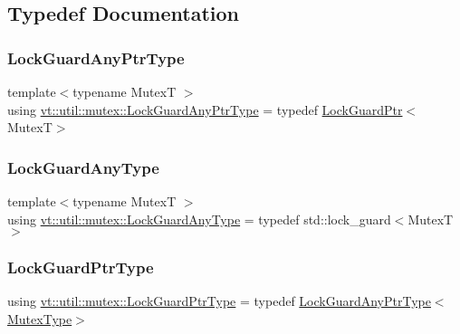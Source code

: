 \subsection{Typedef Documentation}
\mbox{\label{namespacevt_1_1util_1_1mutex_ab8d2986992b726eed741bcae3bf9a789}} 
\subsubsection{\texorpdfstring{Lock\+Guard\+Any\+Ptr\+Type}{LockGuardAnyPtrType}}
{\footnotesize\ttfamily template$<$typename MutexT $>$ \\
using \hyperlink{namespacevt_1_1util_1_1mutex_ab8d2986992b726eed741bcae3bf9a789}{vt\+::util\+::mutex\+::\+Lock\+Guard\+Any\+Ptr\+Type} = typedef \hyperlink{structvt_1_1util_1_1mutex_1_1_lock_guard_ptr}{Lock\+Guard\+Ptr}$<$MutexT$>$}

\mbox{\label{namespacevt_1_1util_1_1mutex_ae88ee37c8846b0738a5137f96f912394}} 
\subsubsection{\texorpdfstring{Lock\+Guard\+Any\+Type}{LockGuardAnyType}}
{\footnotesize\ttfamily template$<$typename MutexT $>$ \\
using \hyperlink{namespacevt_1_1util_1_1mutex_ae88ee37c8846b0738a5137f96f912394}{vt\+::util\+::mutex\+::\+Lock\+Guard\+Any\+Type} = typedef std\+::lock\+\_\+guard$<$MutexT$>$}

\mbox{\label{namespacevt_1_1util_1_1mutex_aca2c02dfb2d46edf4fc867f9ce64d0e5}} 
\subsubsection{\texorpdfstring{Lock\+Guard\+Ptr\+Type}{LockGuardPtrType}}
{\footnotesize\ttfamily using \hyperlink{namespacevt_1_1util_1_1mutex_aca2c02dfb2d46edf4fc867f9ce64d0e5}{vt\+::util\+::mutex\+::\+Lock\+Guard\+Ptr\+Type} = typedef \hyperlink{namespacevt_1_1util_1_1mutex_ab8d2986992b726eed741bcae3bf9a789}{Lock\+Guard\+Any\+Ptr\+Type}$<$\hyperlink{namespacevt_1_1util_1_1mutex_a891571f52e1bcf9eca62d0c2d0862a17}{Mutex\+Type}$>$}

